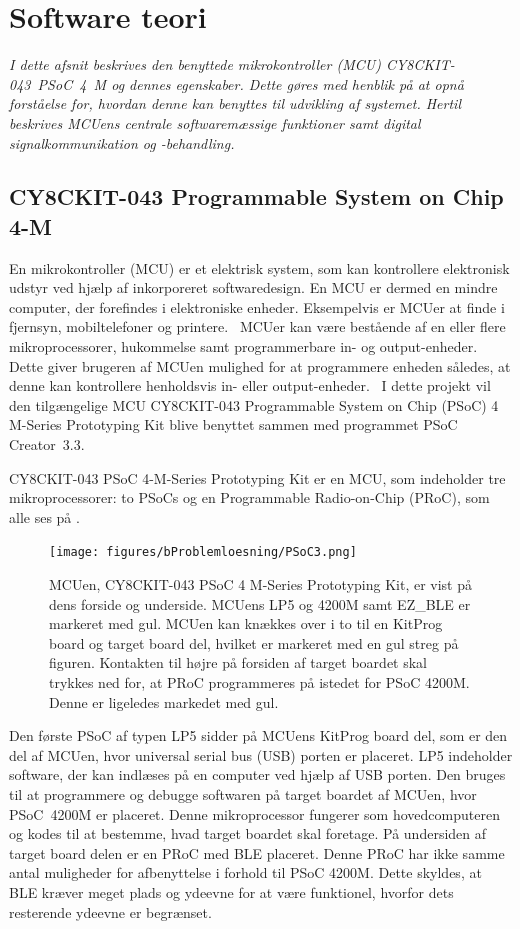 \section{Software teori}
\textit{I dette afsnit beskrives den benyttede mikrokontroller (MCU) CY8CKIT-043~PSoC~4~M og dennes egenskaber. Dette gøres med henblik på at opnå forståelse for, hvordan denne kan benyttes til udvikling af systemet. Hertil beskrives MCUens centrale softwaremæssige funktioner samt digital signalkommunikation og -behandling.}

\subsection{CY8CKIT-043 Programmable System on Chip 4-M}
En mikrokontroller (MCU) er et elektrisk system, som kan kontrollere elektronisk udstyr ved hjælp af inkorporeret softwaredesign. En MCU er dermed en mindre computer, der forefindes i elektroniske enheder. Eksempelvis er MCUer at finde i fjernsyn, mobiltelefoner og printere.~\citep{Scienceuddannelse,Tanenbaum2006} \newline
MCUer kan være bestående af en eller flere mikroprocessorer, hukommelse samt programmerbare in- og output-enheder. Dette giver brugeren af MCUen mulighed for at programmere enheden således, at denne kan kontrollere henholdsvis in- eller output-enheder.~\citep{Scienceuddannelse,Tanenbaum2006} I dette projekt vil den tilgængelige MCU CY8CKIT-043 Programmable System on Chip (PSoC) 4 M-Series Prototyping Kit blive benyttet sammen med programmet PSoC Creator~3.3.

CY8CKIT-043 PSoC 4-M-Series Prototyping Kit er en MCU, som indeholder tre mikroprocessorer: to PSoCs og en Programmable Radio-on-Chip (PRoC), som alle ses på .~\citep{CYPRESS2016PSoC}
\begin{figure}[H]
	\centering
	\texttt{[image: figures/bProblemloesning/PSoC3.png]}
	\caption{MCUen, CY8CKIT-043 PSoC 4 M-Series Prototyping Kit, er vist på dens forside og underside. MCUens LP5 og 4200M samt EZ\_BLE er markeret med gul. MCUen kan knækkes over i to til en KitProg board og target board del, hvilket er markeret med en gul streg på figuren. Kontakten til højre på forsiden af target boardet skal trykkes ned for, at PRoC programmeres på istedet for PSoC 4200M. Denne er ligeledes markedet med gul. \citep{CYPRESS2016PSoC,Semiconductor2016}}
	\label{fig:PSoC}
\end{figure}\vspace{-0.25cm}
Den første PSoC af typen LP5 sidder på MCUens KitProg board del, som er den del af MCUen, hvor universal serial bus (USB) porten er placeret. LP5 indeholder software, der kan indlæses på en computer ved hjælp af USB porten. Den bruges til at programmere og debugge softwaren på target boardet af MCUen, hvor PSoC~4200M er placeret. Denne mikroprocessor fungerer som hovedcomputeren og kodes til at bestemme, hvad target boardet skal foretage. På undersiden af target board delen er en PRoC med BLE placeret. Denne PRoC har ikke samme antal muligheder for afbenyttelse i forhold til PSoC 4200M. Dette skyldes, at BLE kræver meget plads og ydeevne for at være funktionel, hvorfor dets resterende ydeevne er begrænset.~\citep{CYPRESS2016PSoC,Semiconductor2016,CYPRESS2016Cortexm0}

